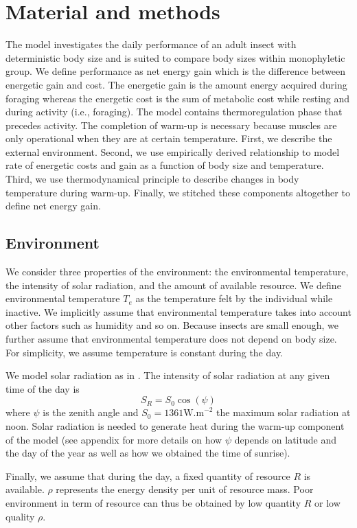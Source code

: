 \section*{Material and methods}
The model investigates the daily performance of an adult insect with deterministic body size and is suited to compare body sizes within monophyletic group.
We define performance as net energy gain which is the difference between energetic gain and cost.
The energetic gain is the amount energy acquired  during foraging whereas  the energetic cost is the sum of metabolic cost while resting and during activity (i.e., foraging).
The model contains thermoregulation phase that precedes activity.
The completion of warm-up is necessary because muscles are only operational when they are at certain temperature. 
First, we describe the external environment.
Second, we use empirically derived relationship to model rate of energetic costs and gain as a function of body size and temperature.
Third, we use thermodynamical principle to describe changes in body temperature during warm-up.
Finally, we stitched these components altogether to define net energy gain. 

\subsection*{Environment}
We consider three properties of the environment: the environmental temperature, the intensity of solar radiation, and the amount of available resource.
We define environmental temperature $T_e$ as the temperature felt by the individual while inactive.
We implicitly assume that environmental temperature takes into account other factors such as humidity and so on.
Because insects are small enough, we further assume that environmental temperature does not depend on body size.
For simplicity, we assume temperature is constant during the day.

We model solar radiation as in \citet{Campbell2012}.
The intensity of solar radiation at any given time of the day is \[S_R = S_0 \cos(\psi) \]
where $\psi$ is the zenith angle and $S_0 = 1361 \mbox{W.m}^{-2}$ the maximum solar radiation at noon.
Solar radiation is needed to generate heat during the warm-up component of the model (see appendix for more details on how $\psi$ depends on latitude and the day of the year as well as how we obtained the time of sunrise).

Finally, we assume that during the day, a fixed quantity of resource $R$ is available.
$\rho$ represents the energy density per unit of resource mass. %
Poor environment in term of resource can thus be obtained by low quantity $R$ or low quality $\rho$.

